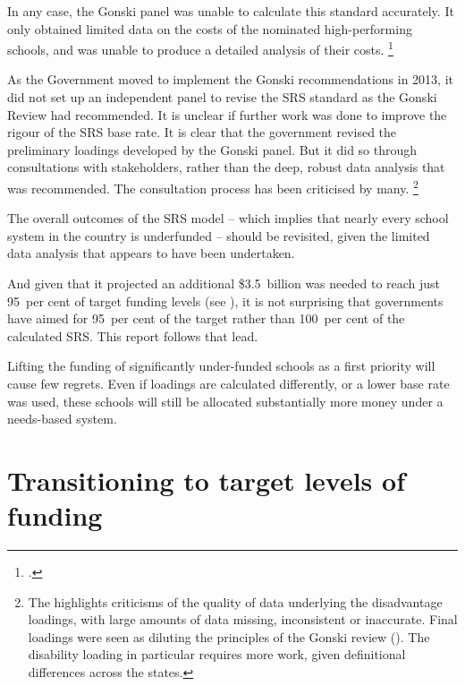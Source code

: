 \documentclass{grattan}
\begin{document}
In any case, the Gonski panel was unable to calculate this standard accurately. It only obtained limited data on the costs of the nominated high-performing schools, and was unable to produce a detailed analysis of their costs.%
\footnote{\textcite{NCA2014TowardsResponsibleGovernment}.}

As the Government moved to implement the Gonski recommendations in 2013, it did not set up an independent panel to revise the SRS standard as the Gonski Review had recommended. It is unclear if further work was done to improve the rigour of the SRS base rate. It is clear that the government revised the preliminary loadings developed by the Gonski panel. But it did so through consultations with stakeholders, rather than the deep, robust data analysis that was recommended. The consultation process has been criticised by many.%
\footnote{The \textcite{NCA2014TowardsResponsibleGovernment} highlights criticisms of the quality of data underlying the disadvantage loadings, with large amounts of data missing, inconsistent or inaccurate. Final loadings were seen as diluting the principles of the Gonski review (\textcite[][42]{Connors2015ImperativesSchoolsFunding}).
The disability loading in particular requires more work, given definitional differences across the states.}

The overall outcomes of the SRS model -- which implies that nearly every school system in the country is underfunded -- should be revisited, given the limited data analysis that appears to have been undertaken.

And given that it projected an additional \$3.5~billion was needed to reach just 95~per cent of target funding levels (see ), it is not surprising that governments have aimed for 95~per cent of the target rather than 100~per cent of the calculated SRS\@. This report follows that lead.

Lifting the funding of significantly under-funded schools as a first priority will cause few regrets.
Even if loadings are calculated differently, or a lower base rate was used, these schools will still be allocated substantially more money under a needs-based system.

\pagebreak[3]
\section{Transitioning to target levels of funding}\label{sec:The-current-transition-arrangements-will-take-a-long-time}
\end{document}
